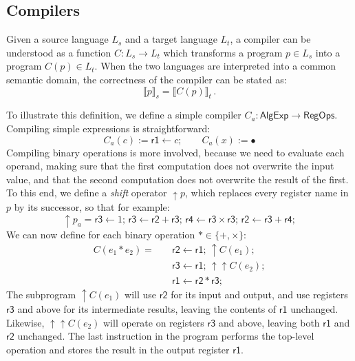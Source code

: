 \documentclass[sigplan,10pt,review,anonymous]{acmart}
\newcommand{\kw}[1]{\ensuremath{ \textsf{#1} }}
\begin{document}

\subsection{Compilers} %

Given a source language $L_s$
and a target language $L_t$,
a compiler can be understood as a function
$C : L_s \rightarrow L_t$
which transforms a program $p \in L_s$
into a program $C(p) \in L_t$.
When the two languages are interpreted into
a common semantic domain,
the correctness of the compiler can be stated as:
\[
  \llbracket p \rrbracket_s = \llbracket C(p) \rrbracket_t \,.
\]

{\color{gray} %

\begin{example}[\kw{AlgExp} to \kw{RegOps}] %
To illustrate this definition,
we define a simple compiler $C_a : \kw{AlgExp} \rightarrow \kw{RegOps}$.
Compiling simple expressions is straightforward:
\[
  C_a(c) := \kw{r1} \leftarrow c; \qquad
  C_a(x) := \bullet
\]
Compiling binary operations is more involved,
because we need to evaluate each operand,
making sure that the first computation does not overwrite
the input value,
and that the second computation does not overwrite
the result of the first.
To this end,
we define a \emph{shift} operator ${\uparrow} p$,
which replaces every register name in $p$ by its successor,
so that for example:
\[
  {\uparrow} p_a =
  \kw{r3} \leftarrow 1; \,
  \kw{r3} \leftarrow \kw{r2} + \kw{r3}; \,
  \kw{r4} \leftarrow \kw{r3} \times \kw{r3}; \,
  \kw{r2} \leftarrow \kw{r3} + \kw{r4};
\]
We can now define for each binary operation $* \in \{+, \times\}$:
\begin{align*}
  C(e_1 * e_2) = \quad  %
    &\kw{r2} \leftarrow \kw{r1}; \, %
    {\uparrow} C(e_1); \\
    &\kw{r3} \leftarrow \kw{r1}; \,
    {\uparrow\uparrow} C(e_2); \\
    &\kw{r1} \leftarrow \kw{r2} * \kw{r3};
\end{align*}
The subprogram ${\uparrow} C(e_1)$
will use $\kw{r2}$ for its input and output,
and use registers $\kw{r3}$ and above for its intermediate results,
leaving the contents of $\kw{r1}$ unchanged.
Likewise,
${\uparrow\uparrow} C(e_2)$
will operate on registers $\kw{r3}$ and above,
leaving both $\kw{r1}$ and $\kw{r2}$ unchanged.
The last instruction in the program performs
the top-level operation and stores the result
in the output register $\kw{r1}$.
\end{example}

}
\end{document}
